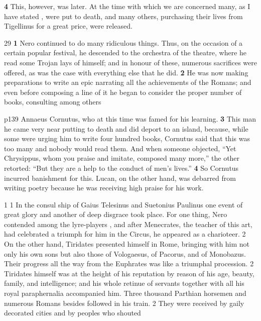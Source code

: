\textbf{4} This, however, was later. At the time with which we are concerned many, as I have stated , were put to death, and many others, purchasing their lives from Tigellinus for a great price, were released.

29
\textbf{1} Nero continued to do many ridiculous things. Thus, on the occasion of a certain popular festival, he descended to the orchestra of the theatre, where he read some Trojan lays of himself; and in honour of these, numerous sacrifices were offered, as was the case with everything else that he did. \textbf{2} He was now making preparations to write an epic narrating all the achievements of the Romans; and even before composing a line of it he began to consider the proper number of books, consulting among others

p139 Annaeus Cornutus, who at this time was famed for his learning. \textbf{3} This man he came very near putting to death and did deport to an island, because, while some were urging him to write four hundred books, Cornutus said that this was too many and nobody would read them. And when someone objected, ``Yet Chrysippus, whom you praise and imitate, composed many more,'' the other retorted: ``But they are a help to the conduct of men's lives.'' \textbf{4} So Cornutus incurred banishment for this. Lucan, on the other hand, was debarred from writing poetry because he was receiving high praise for his work.


1
1 In the consul ­ship of Gaius Telesinus and Suetonius Paulinus one event of great glory and another of deep disgrace took place. For one thing, Nero contended among the lyre-players , and after Menecrates, the teacher of this art, had celebrated a triumph for him in the Circus, he appeared as a charioteer. 2 On the other hand, Tiridates presented himself in Rome, bringing with him not only his own sons but also those of Vologaesus, of Pacorus, and of Monobazus. Their progress all the way from the Euphrates was like a triumphal procession. 2 Tiridates himself was at the height of his reputation by reason of his age, beauty, family, and intelligence; and his whole retinue of servants together with all his royal paraphernalia accompanied him. Three thousand Parthian horsemen and numerous Romans besides followed in his train. 2 They were received by gaily decorated cities and by peoples who shouted

